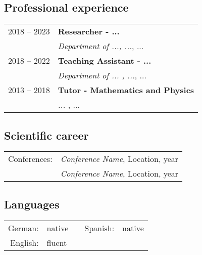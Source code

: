 \subsection*{Professional experience}
\begin{tabular}{ll}
	
	2018 -- 2023 &\textbf{Researcher - ... }\\
                 &\textit{Department of ..., ...}, ...\\
	
	2018 -- 2022 &\textbf{Teaching Assistant - ...}\\
                 &\textit{Department of ... , ...}, ...\\
	
	2013 -- 2018 &\textbf{Tutor - Mathematics and Physics}\\
                 &\textit{ ... }, ...\\
	

	
\end{tabular}

\subsection*{Scientific career}
\begin{tabular}{ll}
	
  Conferences: &\textit{Conference Name}, Location, year \\
               &\textit{Conference Name}, Location, year \\
               
\end{tabular}

\subsection*{Languages}
\begin{tabular}{rlcrl}
	
	German:&native&&Spanish:&native\\
	English:&fluent&&&\\
	
\end{tabular}



